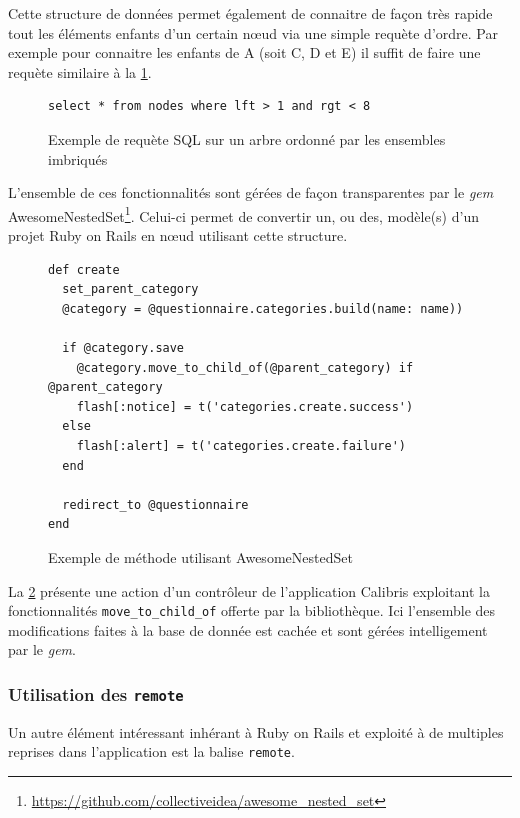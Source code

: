 \documentclass[12pt,a4paper]{book}
\begin{document}
Cette structure de données permet également de connaitre de façon très rapide tout les éléments enfants d'un certain nœud via une simple requète d'ordre. Par exemple pour connaitre les enfants de A (soit C, D et E) il suffit de faire une requète similaire à la \cref{fig.nestedsql}.

\begin{figure}[h]
\lstset{language=sql}
\begin{lstlisting}
select * from nodes where lft > 1 and rgt < 8
\end{lstlisting}
 \caption{Exemple de requète SQL sur un arbre ordonné par les ensembles imbriqués}
 \label{fig.nestedsql}
\end{figure}

L'ensemble de ces fonctionnalités sont gérées de façon transparentes par le \textit{gem} AwesomeNestedSet\footnote{\url{https://github.com/collectiveidea/awesome_nested_set}}. Celui-ci permet de convertir un, ou des, modèle(s) d'un projet Ruby on Rails en nœud utilisant cette structure.

\begin{figure}[h]
\lstset{language=ruby}
\begin{lstlisting}
def create
  set_parent_category
  @category = @questionnaire.categories.build(name: name))

  if @category.save
    @category.move_to_child_of(@parent_category) if @parent_category
    flash[:notice] = t('categories.create.success')
  else
    flash[:alert] = t('categories.create.failure')
  end

  redirect_to @questionnaire
end
\end{lstlisting}
 \caption{Exemple de méthode utilisant AwesomeNestedSet}
 \label{fig.nestedrail}
\end{figure}

La \cref{fig.nestedrail} présente une action d'un contrôleur de l'application Calibris exploitant la fonctionnalités \texttt{move\_to\_child\_of} offerte par la bibliothèque. Ici l'ensemble des modifications faites à la base de donnée est cachée et sont gérées intelligement par le \textit{gem}.

\subsubsection{Utilisation des \texttt{remote}}

Un autre élément intéressant inhérant à Ruby on Rails et exploité à de multiples reprises dans l'application est la balise \texttt{remote}.
\end{document}

